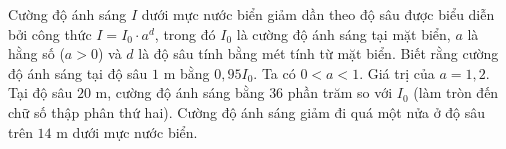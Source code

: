 \begin{ex}
Cường độ ánh sáng $I$ dưới mực nước biển giảm dần theo độ sâu được biểu diễn bởi công thức $I=I_0\cdot a^d$, trong đó $I_0$ là cường độ ánh sáng tại mặt biển, $a$ là hằng số ($a>0$) và $d$ là độ sâu tính bằng mét tính từ mặt biển. Biết rằng cường độ ánh sáng tại độ sâu $1$ m bằng $0{,}95I_0$.
\choiceTF
{\True Ta có $0<a<1$.}
{Giá trị của $a=1{,}2$.}
{\True Tại độ sâu $20$ m, cường độ ánh sáng bằng $36$ phần trăm so với $I_0$ (làm tròn đến chữ số thập phân thứ hai).}
{\True Cường độ ánh sáng giảm đi quá một nửa ở độ sâu trên $14$ m dưới mực nước biển.}
\end{ex}
